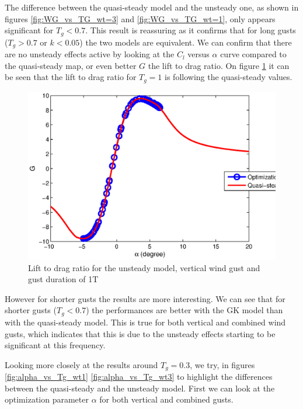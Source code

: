 \par The difference between the quasi-steady model and the unsteady one, as shown in figures \ref{fig:WG_vs_TG_wt=3} and \ref{fig:WG_vs_TG_wt=1}, only appears significant for $T_g<0.7$.
This result is reassuring as it confirms that for long gusts ($T_g>0.7$ or $k<0.05$) the two models are equivalent.
We can confirm that there are no unsteady effects active by looking at the $C_l$ versus $\alpha$ curve compared to the quasi-steady map, or even better $G$ the lift to drag ratio.
On figure \ref{fig:G_vs_alpha_wt=1_Tg=1_GK.eps} it can be seen that the lift to drag ratio for $T_g=1$ is following the quasi-steady values.

\begin{figure}[h]
  \centering
  \includegraphics{./Figures/G_vs_alpha_wt=1_Tg=1_GK.eps}
  \caption{Lift to drag ratio for the unsteady model, vertical wind gust and gust duration of 1T}
  \label{fig:G_vs_alpha_wt=1_Tg=1_GK.eps}
\end{figure}

\par However for shorter gusts the results are more interesting.
We can see that for shorter gusts ($T_g<0.7$) the performances are better with the GK model than with the quasi-steady model.
This is true for both vertical and combined wind gusts, which indicates that this is due to the unsteady effects starting to be significant at this frequency.

\FloatBarrier

\par Looking more closely at the results around $T_g=0.3$, we try, in figures \ref{fig:alpha_vs_Tg_wt1} \ref{fig:alpha_vs_Tg_wt3} to highlight the differences between the quasi-steady and the unsteady model.
First we can look at the optimization parameter $\alpha$ for both vertical and combined gusts.

